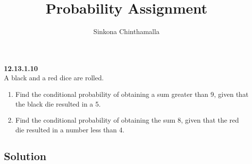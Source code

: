 \documentclass[10pt,column]{article}
\title{\textbf{Probability Assignment}}
\author{Sinkona Chinthamalla}
\begin{document}
\maketitle

\textbf {12.13.1.10} \\
A black and a red dice are rolled.
\begin{enumerate}
\item Find the conditional probability of obtaining a sum greater than 9, given that the black die resulted in a 5.
\item Find the conditional probability of obtaining the sum 8, given that the red die resulted in a number less than 4.
\end{enumerate}

\subsection*{Solution}
\begin{table}[h]
	
\end{table}
\end{document}
